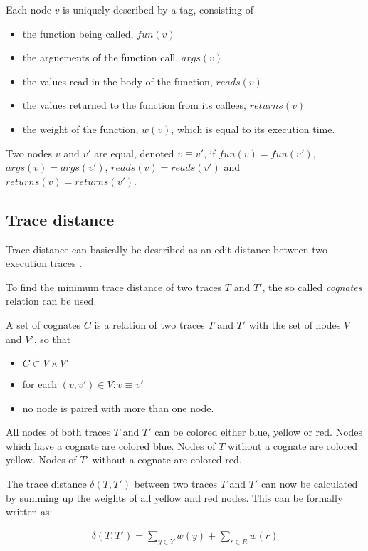 Each node $v$ is uniquely described by a tag, consisting of

\begin{itemize}
\item the function being called, $fun(v)$
\item the arguements of the function call, $args(v)$
\item the values read in the body of the function, $reads(v)$
\item the values returned to the function from its callees, $returns(v)$
\item the weight of the function, $w(v)$, which is equal to its execution time.
\end{itemize}

Two nodes $v$ and $v'$ are equal, denoted $v \equiv v'$, if $fun(v) = fun(v')$, $args(v) = args(v')$, $reads(v) = reads(v')$ and $returns(v) = returns(v')$.

\subsection{Trace distance}
Trace distance can basically be described as an edit distance between two execution traces \cite{Acar2005thesis} \cite{acar2004dynamizing}. 

To find the minimum trace distance of two traces $T$ and $T'$, the so called \textit{cognates} relation can be used. 

A set of cognates $C$ is a relation of two traces $T$ and $T'$ with the set of nodes $V$ and $V'$, so that

\begin{itemize}
\item $C \subset V \times V'$
\item for each $(v, v') \in V: v \equiv v'$ 
\item no node is paired with more than one node. 
\end{itemize}

All nodes of both traces $T$ and $T'$ can be colored either blue, yellow or red. 
Nodes which have a cognate are colored blue. Nodes of $T$ without a cognate are colored yellow. Nodes of $T'$ without a cognate are colored red. 

The trace distance $\delta(T, T')$ between two traces $T$ and $T'$ can now be calculated by summing up the weights of all yellow and red nodes. This can be formally written as: 

\begin{align*}
	\delta(T, T') = \sum_{y \in Y} w(y) + \sum_{r \in R} w(r)
\end{align*}

